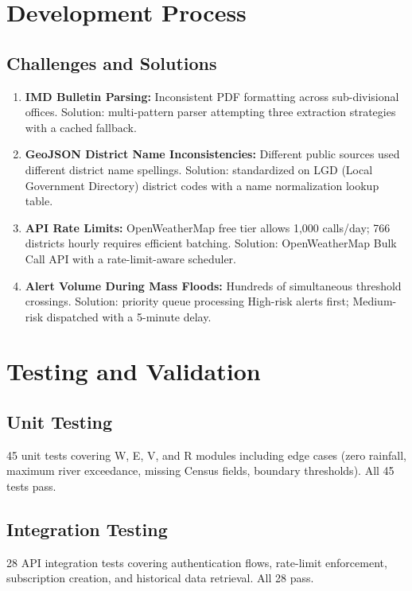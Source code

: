 \documentclass[12pt,a4paper]{report}
\begin{document}
\section{Development Process}

\subsection{Challenges and Solutions}

\begin{enumerate}[noitemsep]
  \item \textbf{IMD Bulletin Parsing:} Inconsistent PDF formatting across sub-divisional offices. Solution: multi-pattern parser attempting three extraction strategies with a cached fallback.
  \item \textbf{GeoJSON District Name Inconsistencies:} Different public sources used different district name spellings. Solution: standardized on LGD (Local Government Directory) district codes with a name normalization lookup table.
  \item \textbf{API Rate Limits:} OpenWeatherMap free tier allows 1,000 calls/day; 766 districts hourly requires efficient batching. Solution: OpenWeatherMap Bulk Call API with a rate-limit-aware scheduler.
  \item \textbf{Alert Volume During Mass Floods:} Hundreds of simultaneous threshold crossings. Solution: priority queue processing High-risk alerts first; Medium-risk dispatched with a 5-minute delay.
\end{enumerate}

\section{Testing and Validation}

\subsection{Unit Testing}
45 unit tests covering W, E, V, and R modules including edge cases (zero rainfall, maximum river exceedance, missing Census fields, boundary thresholds). All 45 tests pass.

\subsection{Integration Testing}
28 API integration tests covering authentication flows, rate-limit enforcement, subscription creation, and historical data retrieval. All 28 pass.
\end{document}
